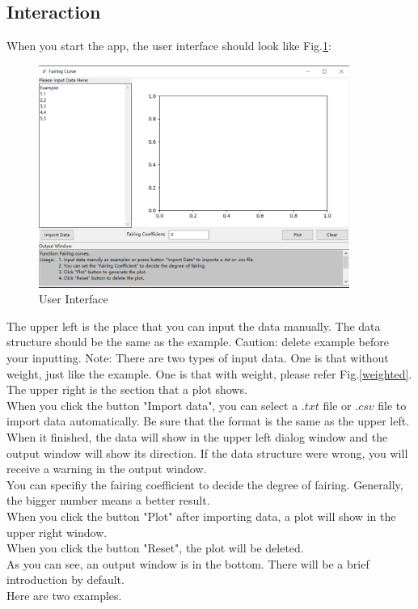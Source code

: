 \documentclass[a4paper]{ctexart}
\begin{document}
\subsection{Interaction}
When you start the app, the user interface should look like Fig.\ref{fig}:
\begin{figure}[!htbp]
	\centering
	\includegraphics[width=4in]{interface}
	\caption{User Interface}
	\label{fig}
\end{figure}
The upper left is the place that you can input the data manually. The data structure should be the same as the example. Caution: delete example before your inputting. Note: There are two types of input data. One is that without weight, just like the example. One is that with weight, please refer Fig.\ref{weighted}.\\
The upper right is the section that a plot shows.\\
When you click the button "Import data", you can select a $.txt$ file or $.csv$ file to import data automatically. Be sure that the format is the same as the upper left. When it finished, the data will show in the upper left dialog window and the output window will show its direction. If the data structure were wrong, you will receive a warning in the output window. \\
You can specifiy the fairing coefficient to decide the degree of fairing. Generally, the bigger number means a better result.\\
When you click the button "Plot" after importing data, a plot will show in the upper right window.\\
When you click the button "Reset", the plot will be deleted.\\
As you can see, an output window is in the bottom. There will be a brief introduction by default.\\
Here are two examples.
\end{document}
